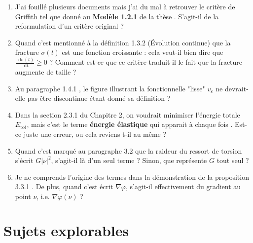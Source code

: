 \documentclass[
  french,
	11pt, %
]{fphw}
\newcommand*\diff{\mathop{}\!\mathrm{d}}
\begin{document}
\begin{enumerate}
  \item J'ai fouillé plusieurs documents mais j'ai du mal à retrouver le critère de Griffith tel que donné au \textbf{Modèle 1.2.1} de la thèse \parencite[p.32]{balasoiu2020thesis}. S'agit-il de la reformulation d'un critère original ?
  \item Quand c'est mentionné à la définition 1.3.2 (Évolution continue) \parencite[p.37]{balasoiu2020thesis} que la fracture $\sigma(t)$ est une fonction croissante : cela veut-il bien dire que $\frac{\diff{\sigma (t)}}{\diff{t}} \geq 0$ ? Comment est-ce que ce critère traduit-il le fait que la fracture augmente de taille ?
  \item Au paragraphe 1.4.1 \parencite[p.37]{balasoiu2020thesis}, le figure illustrant la fonctionnelle "lisse" $v_{\varepsilon}$ ne devrait-elle pas être discontinue étant donné sa définition ?
  \item Dans la section 2.3.1 du Chapitre 2, on voudrait minimiser l'énergie totale $E_{\text{tot}}$, mais c'est le terme \textbf{énergie élastique} qui apparait à chaque fois \parencite[p.49]{balasoiu2020thesis}. Est-ce juste une erreur, ou cela reviens t-il au même ?
  \item Quand c'est marqué au paragraphe 3.2 \parencite[p.92]{balasoiu2020halthesis} que la raideur du ressort de torsion s'écrit $G\vert \nu \vert^2$, s'agit-il là d'un seul terme ? Sinon, que représente $G$ tout seul ?
  \item Je ne comprends l'origine des termes dans la démonstration de la proposition 3.3.1 \parencite[p.93]{balasoiu2020halthesis}. De plus, quand c'est écrit $\nabla \varphi$, s'agit-il effectivement du gradient au point $\nu$, i.e. $\nabla \varphi (\nu)$ ?
\end{enumerate}


\section{Sujets explorables}
\end{document}
